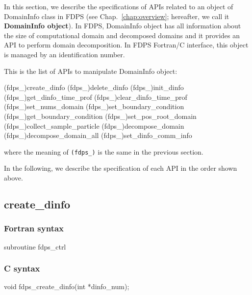 In this section, we describe the specifications of APIs related to an object of DomainInfo class in FDPS (see Chap.~\ref{chap:overview}; hereafter, we call it \textbf{DomainInfo object}). In FDPS, DomainInfo object has all information about the size of computational domain and decomposed domains and it provides an API to perform domain decomposition. In FDPS Fortran/C interface, this object is managed by an identification number.

This is the list of APIs to manipulate DomainInfo object:
\begin{screen}
\begin{spverbatim}
(fdps_)create_dinfo
(fdps_)delete_dinfo
(fdps_)init_dinfo
(fdps_)get_dinfo_time_prof
(fdps_)clear_dinfo_time_prof
(fdps_)set_nums_domain
(fdps_)set_boundary_condition
(fdps_)get_boundary_condition
(fdps_)set_pos_root_domain
(fdps_)collect_sample_particle
(fdps_)decompose_domain
(fdps_)decompose_domain_all
(fdps_)set_dinfo_comm_info\end{spverbatim}  
\end{screen}
where the meaning of \texttt{(fdps\_)} is the same in the previous section.

In the following, we describe the specification of each API in the order shown above.
\clearpage

\subsection{create\_dinfo}
\subsubsection*{Fortran syntax}
\begin{screen}
\begin{spverbatim}
subroutine fdps_ctrl%
\end{spverbatim}
\end{screen}

\subsubsection*{C syntax}
\begin{screen}
\begin{spverbatim}
void fdps_create_dinfo(int *dinfo_num);
\end{spverbatim}
\end{screen}


